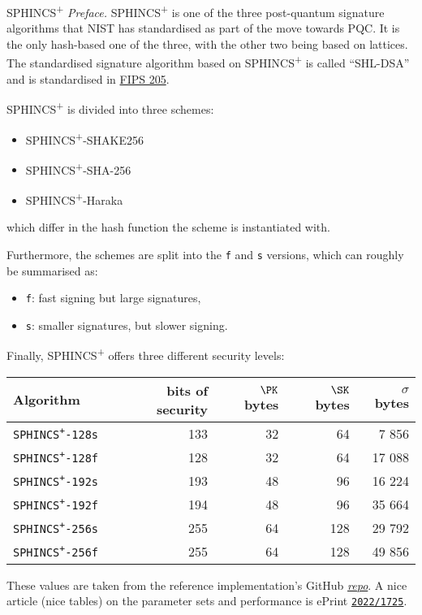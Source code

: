 \documentclass{practice}
\begin{document}
\begin{task}{SPHINCS\textsuperscript{+}}
  \textit{Preface.}
  SPHINCS\textsuperscript{+} is one of the three post-quantum signature algorithms that NIST has standardised as part of the move towards PQC.
  It is the only hash-based one of the three, with the other two being based on lattices.
  The standardised signature algorithm based on SPHINCS\textsuperscript{+} is called \enquote{SHL-DSA} and is standardised in \href{https://csrc.nist.gov/pubs/fips/205/final}{FIPS 205}.

  SPHINCS\textsuperscript{+} is divided into three schemes:
  \begin{itemize}
    \item SPHINCS\textsuperscript{+}-SHAKE256
    \item SPHINCS\textsuperscript{+}-SHA-256
    \item SPHINCS\textsuperscript{+}-Haraka
  \end{itemize}
  which differ in the hash function the scheme is instantiated with.

  Furthermore, the schemes are split into the \texttt{f} and \texttt{s} versions, which can roughly be summarised as:
  \begin{itemize}
    \item \texttt{f}: fast signing but large signatures,
    \item \texttt{s}: smaller signatures, but slower signing.
  \end{itemize}

  Finally, SPHINCS\textsuperscript{+} offers three different security levels:
  \begin{center}
    \begin{tabular}{@{}l r r r r@{}}
      \toprule
      Algorithm & bits of security & $\PK$ bytes & $\SK$ bytes & $\sigma$ bytes\\
      \midrule
      \texttt{SPHINCS\textsuperscript{+}-128s} & 133 & 32 &  64 &  7 856\\
      \texttt{SPHINCS\textsuperscript{+}-128f} & 128 & 32 &  64 & 17 088\\
      \texttt{SPHINCS\textsuperscript{+}-192s} & 193 & 48 &  96 & 16 224\\
      \texttt{SPHINCS\textsuperscript{+}-192f} & 194 & 48 &  96 & 35 664\\
      \texttt{SPHINCS\textsuperscript{+}-256s} & 255 & 64 & 128 & 29 792\\
      \texttt{SPHINCS\textsuperscript{+}-256f} & 255 & 64 & 128 & 49 856\\
      \bottomrule
    \end{tabular}
  \end{center}
  These values are taken from the reference implementation's GitHub \href{https://github.com/sphincs/sphincsplus}{\textit{repo}}.
  A nice article (nice tables) on the parameter sets and performance is ePrint \href{https://eprint.iacr.org/2022/1725}{\texttt{2022/1725}}.


\end{task}
\end{document}
